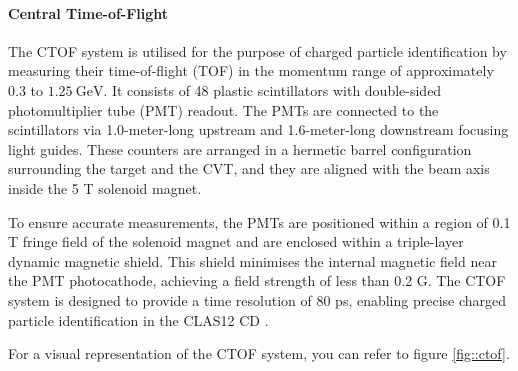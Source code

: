 \paragraph{Central Time-of-Flight}
    The CTOF system is utilised for the purpose of charged particle identification by measuring their time-of-flight (TOF) in the momentum range of approximately $0.3$ to $1.25 ~\text{GeV}$.
    It consists of 48 plastic scintillators with double-sided photomultiplier tube (PMT) readout.
    The PMTs are connected to the scintillators via 1.0-meter-long upstream and 1.6-meter-long downstream focusing light guides.
    These counters are arranged in a hermetic barrel configuration surrounding the target and the CVT, and they are aligned with the beam axis inside the 5 T solenoid magnet.

    To ensure accurate measurements, the PMTs are positioned within a region of 0.1 T fringe field of the solenoid magnet and are enclosed within a triple-layer dynamic magnetic shield.
    This shield minimises the internal magnetic field near the PMT photocathode, achieving a field strength of less than 0.2 G.
    The CTOF system is designed to provide a time resolution of 80 ps, enabling precise charged particle identification in the CLAS12 CD \cite{carman2020ctof}.

    For a visual representation of the CTOF system, you can refer to figure \ref{fig::ctof}.
